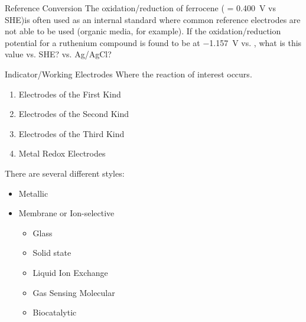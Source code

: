 \documentclass[notes=show]{beamer}
\begin{document}
\begin{frame}[t]{Reference Conversion}
	The oxidation/reduction of ferrocene ( =
	\SI{0.400}{\volt} vs SHE)\footnotemark is often used as an internal standard where
	common reference electrodes are not able to be used (organic media, for
	example). If the oxidation/reduction potential for a ruthenium compound
	is found to be at \SI{-1.157}{\volt} vs.
	, what
	is this value vs. SHE? vs. Ag/AgCl?

	\vfill


\end{frame}

\clearpage

\begin{frame}{Indicator/Working Electrodes}
	Where the reaction of interest occurs.

	\begin{enumerate}
		\item Electrodes of the First Kind
		\item Electrodes of the Second Kind
		\item Electrodes of the Third Kind
		\item Metal Redox Electrodes
	\end{enumerate}

	There are several different styles:
	\begin{itemize}
		\item Metallic
		\item Membrane or Ion-selective
			\begin{itemize}
				\item Glass
				\item Solid state
				\item Liquid Ion Exchange
				\item Gas Sensing Molecular
				\item Biocatalytic
			\end{itemize}
	\end{itemize}
\end{frame}
\end{document}
